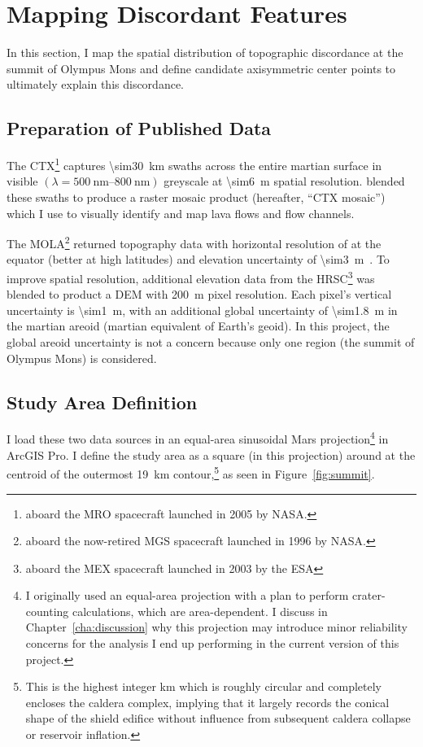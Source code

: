 \section{Mapping Discordant Features}\label{sec:mapping}

In this section, I map the spatial distribution of topographic discordance at the summit of Olympus Mons and define candidate axisymmetric center points to ultimately explain this discordance.

\subsection{Preparation of Published Data}

The \acf{CTX}\footnote{aboard the \ac{MRO} spacecraft launched in 2005 by \acs{NASA}.} captures \qty{\sim30}{\km} swaths across the entire martian surface in visible $(\lambda=\qtyrange{500}{800}{\nm})$ greyscale at \qty{\sim6}{\m} spatial resolution. \textcite{Dickson2018AGB} blended these swaths to produce a raster mosaic product (hereafter, ``\ac{CTX} mosaic'') which I use to visually identify and map lava flows and flow channels.

The \acf{MOLA}\footnote{aboard the now-retired \ac{MGS} spacecraft launched in 1996 by \acs{NASA}.} returned topography data with horizontal resolution of  at the equator (better at high latitudes) and elevation uncertainty of \qty{\sim3}{\m}~\parencite{smith_mars_2001}. To improve spatial resolution, additional elevation data from the \ac{HRSC}\footnote{aboard the \ac{MEX} spacecraft launched in 2003 by the \ac{ESA}} was blended to product a \ac{DEM} with \qty{200}{\m} pixel resolution. Each pixel's vertical uncertainty is \qty{\sim1}{\m}, with an additional global uncertainty of \qty{\sim1.8}{\m} in the martian areoid (martian equivalent of Earth's geoid). In this project, the global areoid uncertainty is not a concern because only one region (the summit of Olympus Mons) is considered.

\subsection{Study Area Definition}

I load these two data sources in an equal-area sinusoidal Mars projection\footnote{I originally used an equal-area projection with a plan to perform crater-counting calculations, which are area-dependent. I discuss in Chapter~\ref{cha:discussion} why this projection may introduce minor reliability concerns for the analysis I end up performing in the current version of this project.} in ArcGIS Pro. I define the study area as a square (in this projection)  around at the centroid of the outermost \qty{19}{\km} contour,\footnote{This is the highest integer \unit{km} which is roughly circular and completely encloses the caldera complex, implying that it largely records the conical shape of the shield edifice without influence from subsequent caldera collapse or reservoir inflation.} as seen in Figure~\ref{fig:summit}.

